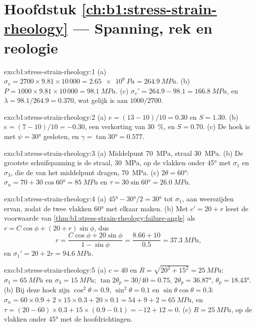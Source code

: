\section*{Hoofdstuk \ref{ch:b1:stress-strain-rheology} --- Spanning, rek en reologie}

\begin{solution}{exo:b1:stress-strain-rheology:1}
(a) $\sigma_v = 2700\times9.81\times10\,000 = \qty{2.65e8}{Pa} = \qty{264.9}{MPa}$.
(b) $P = 1000\times9.81\times10\,000 = \qty{98.1}{MPa}$. (c) $\sigma_v' =
264.9 - 98.1 = \qty{166.8}{MPa}$, en $\lambda = 98.1/264.9 = 0.370$, wat
gelijk is aan $1000/2700$.
\end{solution}

\begin{solution}{exo:b1:stress-strain-rheology:2}
(a) $e = (13-10)/10 = 0.30$ en $S = 1.30$. (b) $e = (7-10)/10 = -0.30$, een
verkorting van \qty{30}{\percent}, en $S = 0.70$. (c) De hoek is met
$\psi = \ang{30}$ gesloten, en $\gamma = \tan\ang{30} = 0.577$.
\end{solution}

\begin{solution}{exo:b1:stress-strain-rheology:3}
(a) Middelpunt \qty{70}{MPa}, straal \qty{30}{MPa}. (b) De grootste schuifspanning
is de straal, \qty{30}{MPa}, op de vlakken onder \ang{45} met $\sigma_1$ en
$\sigma_3$, die de  van het middelpunt dragen, \qty{70}{MPa}. (c)
$2\theta = \ang{60}$: $\sigma_n = 70 + 30\cos\ang{60} = \qty{85}{MPa}$ en
$\tau = 30\sin\ang{60} = \qty{26.0}{MPa}$.
\end{solution}

\begin{solution}{exo:b1:stress-strain-rheology:4}
(a) $\ang{45} - \ang{30}/2 = \ang{30}$ tot $\sigma_1$, aan weerszijden ervan,
zodat de twee vlakken \ang{60} met elkaar maken. (b) Met $c' = 20 + r$ leest de
voorwaarde van \cref{thm:b1:stress-strain-rheology:failure-angle} als
$r = C\cos\phi + (20 + r)\sin\phi$, dus
\[
  r = \frac{C\cos\phi + 20\sin\phi}{1 - \sin\phi} = \frac{8.66 + 10}{0.5}
    = \qty{37.3}{MPa},
\]
en $\sigma_1' = 20 + 2r = \qty{94.6}{MPa}$.
\end{solution}

\begin{solution}{exo:b1:stress-strain-rheology:5}
(a) $c = 40$ en $R = \sqrt{20^2 + 15^2} = \qty{25}{MPa}$: $\sigma_1 =
\qty{65}{MPa}$ en $\sigma_3 = \qty{15}{MPa}$; $\tan2\theta_p = 30/40 = 0.75$,
$2\theta_p = \ang{36.87}$, $\theta_p = \ang{18.43}$. (b) Bij deze hoek zijn
$\cos^2\theta = 0.9$, $\sin^2\theta = 0.1$ en $\sin\theta\cos\theta = 0.3$:
$\sigma_n = 60\times0.9 + 2\times15\times0.3 + 20\times0.1 = 54 + 9 + 2 =
\qty{65}{MPa}$, en $\tau = (20-60)\times0.3 + 15\times(0.9-0.1) = -12 + 12 =
0$. (c) $R = \qty{25}{MPa}$, op de vlakken onder \ang{45} met de hoofdrichtingen.
\end{solution}

